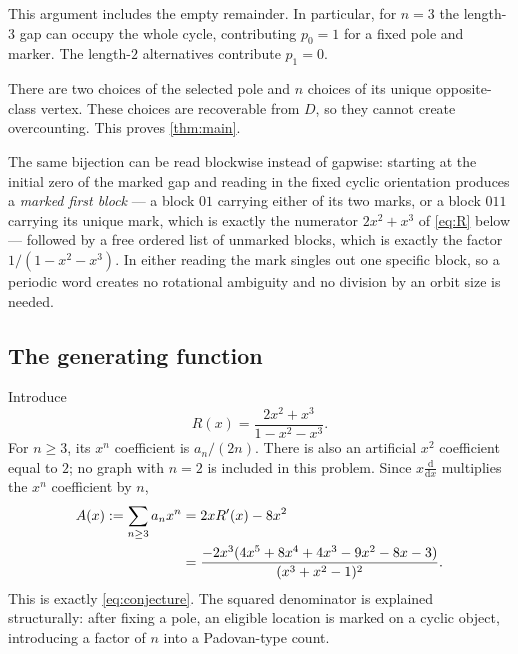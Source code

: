 \documentclass[11pt,letterpaper]{article}
\numberwithin{equation}{section}
\theoremstyle{definition}
\newcommand{\1}{\mathbf 1}
\begin{document}
This argument includes the empty remainder. In particular, for $n=3$ the
length-$3$ gap can occupy the whole cycle, contributing $p_0=1$ for a fixed
pole and marker. The length-$2$ alternatives contribute $p_1=0$.

There are two choices of the selected pole and $n$ choices of its unique
opposite-class vertex. These choices are recoverable from $D$, so they cannot
create overcounting. This proves \cref{thm:main}.

The same bijection can be read blockwise instead of gapwise: starting at the
initial zero of the marked gap and reading in the fixed cyclic orientation
produces a \emph{marked first block} --- a block $01$ carrying either of its two
marks, or a block $011$ carrying its unique mark, which is exactly the
numerator $2x^2+x^3$ of \eqref{eq:R} below --- followed by a free ordered list
of unmarked blocks, which is exactly the factor $1/(1-x^2-x^3)$. In either
reading the mark singles out one specific block, so a periodic word creates no
rotational ambiguity and no division by an orbit size is needed.

\subsection{The generating function}
Introduce
\begin{equation}\label{eq:R}
 R(x)=\frac{2x^2+x^3}{1-x^2-x^3}.
\end{equation}
For $n\ge3$, its $x^n$ coefficient is $a_n/(2n)$. There is also an artificial
$x^2$ coefficient equal to $2$; no graph with $n=2$ is included in this problem.
Since $x\frac{\mathrm d}{\mathrm dx}$ multiplies the $x^n$ coefficient by $n$,
\begin{align}\label{eq:derivativegf}
 A(x):=\sum_{n\ge3}a_nx^n
 &=2xR'(x)-8x^2\\
 &=\frac{-2x^3(4x^5+8x^4+4x^3-9x^2-8x-3)}{(x^3+x^2-1)^2}.\notag
\end{align}
This is exactly \eqref{eq:conjecture}. The squared denominator is explained
structurally: after fixing a pole, an eligible location is marked on a cyclic
object, introducing a factor of $n$ into a Padovan-type count.
\end{document}
